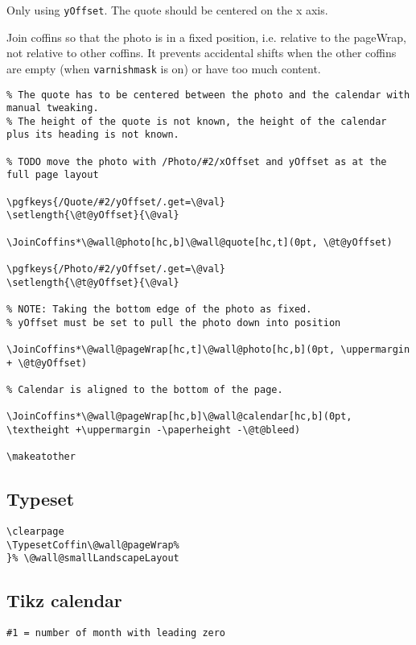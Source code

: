 \documentclass[11pt,oneside]{memoir-article}
\begin{document}
Only using \texttt{yOffset}. The quote should be centered on the x axis.

Join coffins so that the photo is in a fixed position, i.e. relative to the
pageWrap, not relative to other coffins. It prevents accidental shifts when the
other coffins are empty (when \texttt{varnishmask} is on) or have too much content.

\begin{verbatim}
% The quote has to be centered between the photo and the calendar with manual tweaking.
% The height of the quote is not known, the height of the calendar plus its heading is not known.

% TODO move the photo with /Photo/#2/xOffset and yOffset as at the full page layout

\pgfkeys{/Quote/#2/yOffset/.get=\@val}
\setlength{\@t@yOffset}{\@val}

\JoinCoffins*\@wall@photo[hc,b]\@wall@quote[hc,t](0pt, \@t@yOffset)

\pgfkeys{/Photo/#2/yOffset/.get=\@val}
\setlength{\@t@yOffset}{\@val}

% NOTE: Taking the bottom edge of the photo as fixed.
% yOffset must be set to pull the photo down into position

\JoinCoffins*\@wall@pageWrap[hc,t]\@wall@photo[hc,b](0pt, \uppermargin + \@t@yOffset)

% Calendar is aligned to the bottom of the page.

\JoinCoffins*\@wall@pageWrap[hc,b]\@wall@calendar[hc,b](0pt, \textheight +\uppermargin -\paperheight -\@t@bleed)

\makeatother
\end{verbatim}

\subsection{Typeset}
\label{sec:org99a6714}

\begin{verbatim}
\clearpage
\TypesetCoffin\@wall@pageWrap%
}% \@wall@smallLandscapeLayout
\end{verbatim}

\subsection{Tikz calendar}
\label{sec:org86b7136}

\begin{verbatim}
#1 = number of month with leading zero
\end{verbatim}
\end{document}
